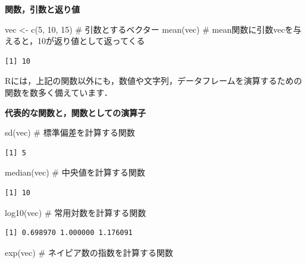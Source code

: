\documentclass[
  letterpaper,
  DIV=11,
  numbers=noendperiod]{scrreprt}
\newenvironment{Shaded}{\begin{snugshade}}{\end{snugshade}}
\newcommand{\CommentTok}[1]{\textcolor[rgb]{0.37,0.37,0.37}{#1}}
\newcommand{\DecValTok}[1]{\textcolor[rgb]{0.68,0.00,0.00}{#1}}
\newcommand{\FunctionTok}[1]{\textcolor[rgb]{0.28,0.35,0.67}{#1}}
\newcommand{\NormalTok}[1]{\textcolor[rgb]{0.00,0.23,0.31}{#1}}
\newcommand{\OtherTok}[1]{\textcolor[rgb]{0.00,0.23,0.31}{#1}}
\begin{document}
\textbf{関数，引数と返り値}

\begin{Shaded}
\begin{Highlighting}[]
\NormalTok{vec }\OtherTok{\textless{}{-}} \FunctionTok{c}\NormalTok{(}\DecValTok{5}\NormalTok{, }\DecValTok{10}\NormalTok{, }\DecValTok{15}\NormalTok{) }\CommentTok{\# 引数とするベクター}
\FunctionTok{mean}\NormalTok{(vec) }\CommentTok{\# mean関数に引数vecを与えると，10が返り値として返ってくる}
\end{Highlighting}
\end{Shaded}

\begin{verbatim}
[1] 10
\end{verbatim}

Rには，上記の関数以外にも，数値や文字列，データフレームを演算するための関数を数多く備えています．

\textbf{代表的な関数と，関数としての演算子}

\begin{Shaded}
\begin{Highlighting}[]
\FunctionTok{sd}\NormalTok{(vec) }\CommentTok{\# 標準偏差を計算する関数}
\end{Highlighting}
\end{Shaded}

\begin{verbatim}
[1] 5
\end{verbatim}

\begin{Shaded}
\begin{Highlighting}[]
\FunctionTok{median}\NormalTok{(vec) }\CommentTok{\# 中央値を計算する関数}
\end{Highlighting}
\end{Shaded}

\begin{verbatim}
[1] 10
\end{verbatim}

\begin{Shaded}
\begin{Highlighting}[]
\FunctionTok{log10}\NormalTok{(vec) }\CommentTok{\# 常用対数を計算する関数}
\end{Highlighting}
\end{Shaded}

\begin{verbatim}
[1] 0.698970 1.000000 1.176091
\end{verbatim}

\begin{Shaded}
\begin{Highlighting}[]
\FunctionTok{exp}\NormalTok{(vec) }\CommentTok{\# ネイピア数の指数を計算する関数}
\end{Highlighting}
\end{Shaded}
\end{document}

